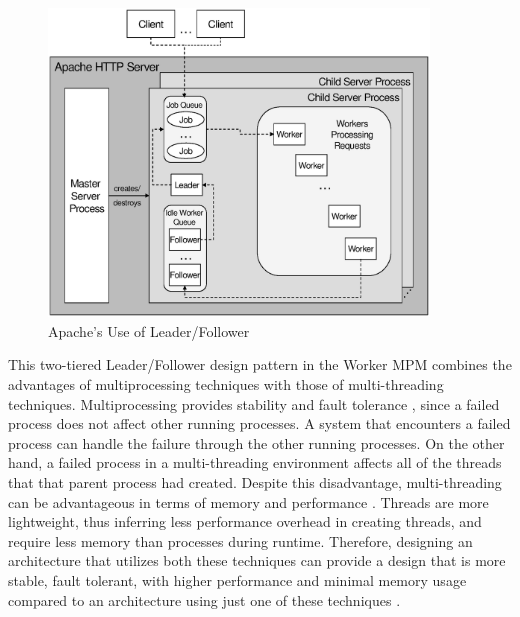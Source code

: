 \begin{figure}
\begin{center}
  \includegraphics[width=0.9\textwidth]{./images/apacheLeaderFollower}
  \caption{Apache's Use of Leader/Follower}
  \label{fig:apache}
\end{center}
\end{figure}

This two-tiered Leader/Follower design pattern in the Worker MPM combines the
advantages of multiprocessing techniques with those of multi-threading
techniques. Multiprocessing provides stability and fault tolerance
\cite{Apache}, since a failed process does not affect other running processes. A
system that encounters a failed process can handle the failure through the other
running processes. On the other hand, a failed process in a multi-threading
environment affects all of the threads that that parent process had created.
Despite this disadvantage, multi-threading can be advantageous in terms of memory
and performance \cite{Apache}. Threads are more lightweight, thus inferring less
performance overhead in creating threads, and require less memory than
processes during runtime. Therefore, designing an architecture that utilizes
both these techniques can provide a design that is more stable, fault tolerant,
with higher performance and minimal memory usage compared to an architecture
using just one of these techniques \cite{Apache}.
